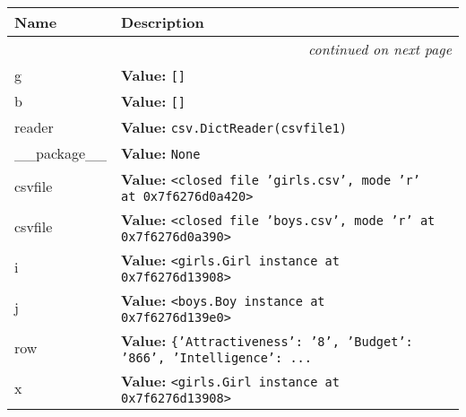     \vspace{-1cm}
\hspace{\varindent}\begin{longtable}{|p{\varnamewidth}|p{\vardescrwidth}|l}
\cline{1-2}
\cline{1-2} \centering \textbf{Name} & \centering \textbf{Description}& \\
\cline{1-2}
\endhead\cline{1-2}\multicolumn{3}{r}{\small\textit{continued on next page}}\\\endfoot\cline{1-2}
\endlastfoot\raggedright g\- & \raggedright \textbf{Value:} 
{\tt []}&\\
\cline{1-2}
\raggedright b\- & \raggedright \textbf{Value:} 
{\tt []}&\\
\cline{1-2}
\raggedright r\-e\-a\-d\-e\-r\- & \raggedright \textbf{Value:} 
{\tt csv.DictReader(csvfile1)}&\\
\cline{1-2}
\raggedright \_\-\_\-p\-a\-c\-k\-a\-g\-e\-\_\-\_\- & \raggedright \textbf{Value:} 
{\tt None}&\\
\cline{1-2}
\raggedright c\-s\-v\-f\-i\-l\-e\- & \raggedright \textbf{Value:} 
{\tt {\textless}closed file 'girls.csv', mode 'r' at 0x7f6276d0a420{\textgreater}}&\\
\cline{1-2}
\raggedright c\-s\-v\-f\-i\-l\-e\-1\- & \raggedright \textbf{Value:} 
{\tt {\textless}closed file 'boys.csv', mode 'r' at 0x7f6276d0a390{\textgreater}}&\\
\cline{1-2}
\raggedright i\- & \raggedright \textbf{Value:} 
{\tt {\textless}girls.Girl instance at 0x7f6276d13908{\textgreater}}&\\
\cline{1-2}
\raggedright j\- & \raggedright \textbf{Value:} 
{\tt {\textless}boys.Boy instance at 0x7f6276d139e0{\textgreater}}&\\
\cline{1-2}
\raggedright r\-o\-w\- & \raggedright \textbf{Value:} 
{\tt \texttt{\{}\texttt{'}\texttt{Attractiveness}\texttt{'}\texttt{: }\texttt{'}\texttt{8}\texttt{'}\texttt{, }\texttt{'}\texttt{Budget}\texttt{'}\texttt{: }\texttt{'}\texttt{866}\texttt{'}\texttt{, }\texttt{'}\texttt{Intelligence}\texttt{'}\texttt{: }\texttt{...}}&\\
\cline{1-2}
\raggedright x\- & \raggedright \textbf{Value:} 
{\tt {\textless}girls.Girl instance at 0x7f6276d13908{\textgreater}}&\\
\cline{1-2}
\end{longtable}

